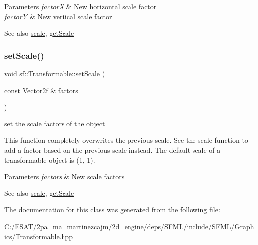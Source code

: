 \begin{DoxyParams}{Parameters}
{\em factorX} & New horizontal scale factor \\
\hline
{\em factorY} & New vertical scale factor\\
\hline
\end{DoxyParams}
\begin{DoxySeeAlso}{See also}
\hyperlink{classsf_1_1_transformable_a3de0c6d8957f3cf318092f3f60656391}{scale}, \hyperlink{classsf_1_1_transformable_a73819fdea80ca8a06fad8a0067b4588c}{get\+Scale} 
\end{DoxySeeAlso}
\mbox{\label{classsf_1_1_transformable_a4c48a87f1626047e448f9c1a68ff167e}} 
\subsubsection{\texorpdfstring{set\+Scale()}{setScale()}\hspace{0.1cm}{\footnotesize\ttfamily [2/2]}}
{\footnotesize\ttfamily void sf\+::\+Transformable\+::set\+Scale (\begin{DoxyParamCaption}\item[{const \hyperlink{classsf_1_1_vector2}{Vector2f} \&}]{factors }\end{DoxyParamCaption})}



set the scale factors of the object 

This function completely overwrites the previous scale. See the scale function to add a factor based on the previous scale instead. The default scale of a transformable object is (1, 1).


\begin{DoxyParams}{Parameters}
{\em factors} & New scale factors\\
\hline
\end{DoxyParams}
\begin{DoxySeeAlso}{See also}
\hyperlink{classsf_1_1_transformable_a3de0c6d8957f3cf318092f3f60656391}{scale}, \hyperlink{classsf_1_1_transformable_a73819fdea80ca8a06fad8a0067b4588c}{get\+Scale} 
\end{DoxySeeAlso}


The documentation for this class was generated from the following file\+:\begin{DoxyCompactItemize}
\item 
C\+:/\+E\+S\+A\+T/2pa\+\_\+ma\+\_\+martinezcajm/2d\+\_\+engine/deps/\+S\+F\+M\+L/include/\+S\+F\+M\+L/\+Graphics/Transformable.\+hpp\end{DoxyCompactItemize}
